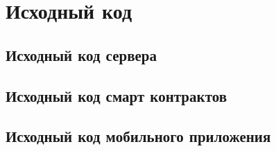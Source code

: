 


\chapter{Исходный код} \label{app:B}

\section{Исходный код сервера}\label{app:B1}

\section{Исходный код смарт контрактов}\label{app:B2}

\section{Исходный код мобильного приложения}\label{app:B3}

